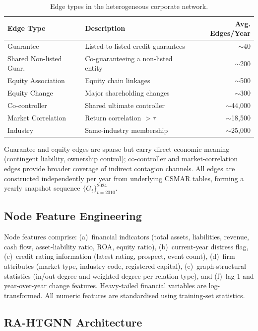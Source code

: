 \documentclass[3p,times,procedia]{elsarticle}
\begin{document}
\begin{table}[htbp]
\centering
\caption{Edge types in the heterogeneous corporate network.}\label{tab:edge_types}
\begin{tabular}{@{}llr@{}}
\toprule
Edge Type & Description & Avg. Edges/Year \\
\midrule
Guarantee & Listed-to-listed credit guarantees & $\sim$40 \\
Shared Non-listed Guar. & Co-guaranteeing a non-listed entity & $\sim$200 \\
Equity Association & Equity chain linkages & $\sim$500 \\
Equity Change & Major shareholding changes & $\sim$300 \\
Co-controller & Shared ultimate controller & $\sim$44{,}000 \\
Market Correlation & Return correlation $> \tau$ & $\sim$18{,}500 \\
Industry & Same-industry membership & $\sim$25{,}000 \\
\bottomrule
\end{tabular}
\end{table}

Guarantee and equity edges are sparse but carry direct economic meaning (contingent liability, ownership control); co-controller and market-correlation edges provide broader coverage of indirect contagion channels.
All edges are constructed independently per year from underlying CSMAR tables, forming a yearly snapshot sequence $\{G_t\}_{t=2010}^{2024}$.

\subsection{Node Feature Engineering}
\label{subsec:features}

Node features comprise: (a)~financial indicators (total assets, liabilities, revenue, cash flow, asset-liability ratio, ROA, equity ratio), (b)~current-year distress flag, (c)~credit rating information (latest rating, prospect, event count), (d)~firm attributes (market type, industry code, registered capital), (e)~graph-structural statistics (in/out degree and weighted degree per relation type), and (f)~lag-1 and year-over-year change features.
Heavy-tailed financial variables are log-transformed.
All numeric features are standardised using training-set statistics.

\subsection{RA-HTGNN Architecture}
\label{subsec:architecture}
\end{document}
